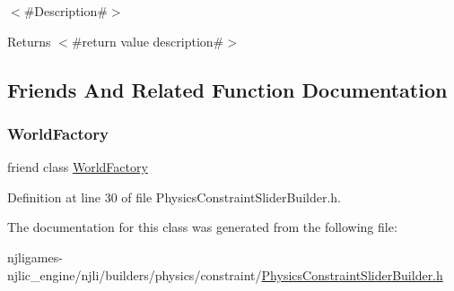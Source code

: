 $<$\#\+Description\#$>$

\begin{DoxyReturn}{Returns}
$<$\#return value description\#$>$ 
\end{DoxyReturn}


\subsection{Friends And Related Function Documentation}
\mbox{\label{classnjli_1_1_physics_constraint_slider_builder_acb96ebb09abe8f2a37a915a842babfac}} 
\subsubsection{\texorpdfstring{World\+Factory}{WorldFactory}}
{\footnotesize\ttfamily friend class \mbox{\hyperlink{classnjli_1_1_world_factory}{World\+Factory}}\hspace{0.3cm}{\ttfamily [friend]}}



Definition at line 30 of file Physics\+Constraint\+Slider\+Builder.\+h.



The documentation for this class was generated from the following file\+:\begin{DoxyCompactItemize}
\item 
njligames-\/njlic\+\_\+engine/njli/builders/physics/constraint/\mbox{\hyperlink{_physics_constraint_slider_builder_8h}{Physics\+Constraint\+Slider\+Builder.\+h}}\end{DoxyCompactItemize}
